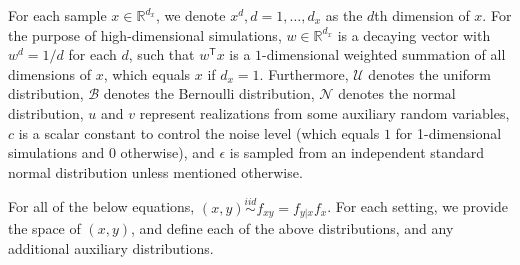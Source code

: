 \documentclass[11pt]{article}
\providecommand{\mc}[1]{\mathcal{#1}}
\newcommand{\Real}{\mathbb{R}}
\newcommand{\T}{^{\ensuremath{\mathsf{T}}}}           %
\begin{document}
For each sample $x \in \Real^{d_{x}}$, we denote $x^{d}, d=1,\ldots,d_{x}$ as the $d$th dimension of $x$. For the purpose of high-dimensional simulations, $w \in \Real^{d_{x}}$ is a decaying vector with $w^{d}=1/d$ for each $d$, such that $w\T x$ is a $1$-dimensional weighted summation of all dimensions of $x$, which equals $x$ if $d_{x}=1$. Furthermore, $\mc{U}$ denotes the uniform distribution, $\mc{B}$ denotes the Bernoulli distribution, $\mc{N}$ denotes the normal distribution, $u$ and $v$ represent realizations from some auxiliary random variables, $c$ is a scalar constant to control the noise level (which equals $1$ for 1-dimensional simulations and $0$ otherwise), and $\epsilon$ is sampled from an independent standard normal distribution unless mentioned otherwise. 

For all of the below equations, $(x,y) \overset{iid}{\sim} f_{xy} = f_{y|x} f_x$. For each setting, we provide the space of $(x,y)$, and define each of the above distributions, and any additional auxiliary distributions.
\end{document}
